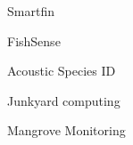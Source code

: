 \item Smartfin
\item FishSense
\item Acoustic Species ID
\item Junkyard computing
\item Mangrove Monitoring